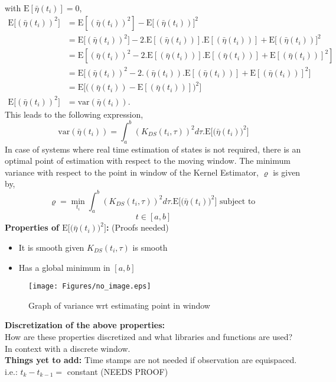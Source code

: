\documentclass{article}
\begin{document}
with $\text{E}[\bar{\eta}(t_i)]=0$,
\begin{align*}
\text{E}\big[(\bar{\eta}(t_i))^2] &= \text{E}[(\bar{\eta}(t_i))^2] - \text{E}[(\bar{\eta}(t_i))\big]^2 \\
&= \text{E}\big[(\bar{\eta}(t_i))^2] - 2. \text{E}[(\bar{\eta}(t_i))].\text{E}[(\bar{\eta}(t_i))] + \text{E}[(\bar{\eta}(t_i))\big]^2 \\
&= \text{E}[(\bar{\eta}(t_i))^2 - 2.\text{E}[(\bar{\eta}(t_i))].\text{E}[(\bar{\eta}(t_i))] + \text{E}[(\bar{\eta}(t_i))]^2 ] \\
&= \text{E}\big[(\bar{\eta}(t_i))^2 - 2.(\bar{\eta}(t_i)).\text{E}[(\bar{\eta}(t_i))] + \text{E}[(\bar{\eta}(t_i))]^2 \big] \\
&= \text{E}\Big[\big((\bar{\eta}(t_i))- \text{E}[(\bar{\eta}(t_i))]\big)^2 \Big] \\
\text{E}\big[(\bar{\eta}(t_i))^2] &= \text{var}(\bar{\eta}(t_i)).
\end{align*}
This leads to the following expression,
\begin{equation}
\text{var}(\bar{\eta}(t_i)) = \int_a^b \left(K_{DS}(t_i,\tau)\right)^2 d\tau . \text{E}\Big[\big( \bar{\eta}(t_i) \big)^2\Big]
\end{equation}
In case of systems where real time estimation of states is not required, there is an optimal point of estimation with respect to the moving window. The minimum variance with respect to the point in window of the Kernel Estimator, $\varrho$ is given by, 
\begin{equation}
	\varrho = \displaystyle{\min_{t_i}} \int_a^b \left(K_{DS}(t_i,\tau)\right)^2 d\tau . \text{E}\Big[\big( \bar{\eta}(t_i) \big)^2\Big] \text{ subject to } 
\end{equation}
$$ t \in [a,b] $$
\textbf{Properties of $\text{E}\Big[\big(\bar{\eta}(t_i)\big)^2\Big]$:} (Proofs needed)
\begin{itemize}
	\item It is smooth given $K_{DS}(t_i,\tau)$ is smooth
	\item Has a global minimum in $[a,b]$ 
\end{itemize}

\begin{figure}[H]
\centering
\texttt{[image: Figures/no\_image.eps]}
\caption{Graph of variance wrt estimating point in window}
\label{quad_red_balls}
\end{figure}

\textbf{Discretization of the above properties:}\\
How are these properties discretized and what libraries and functions are used? In context with a discrete window.\\ \textbf{Things yet to add:} Time stamps are not needed if observation are equispaced. i.e.: $t_k - t_{k-1} = $ constant (NEEDS PROOF)\\
\end{document}
